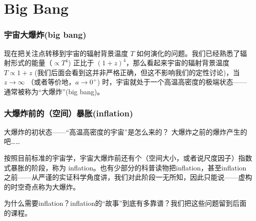 \documentclass[CJK,13pt]{beamer}
\begin{document}




\section{Big Bang}

  \begin{frame}
    \frametitle{宇宙大爆炸(big bang)}
    现在把关注点转移到宇宙的辐射背景温度 $T$ 如何演化的问题。我们已经熟悉了辐射形式的能量（$\propto T^4$) 正比于 $(1+z)^4$，那么看起来宇宙的辐射背景温度 $T\propto 1+z$ (我们后面会看到这并非严格正确，但这不影响我们的定性讨论)，当 $z\rightarrow \infty$ （或者等价地，$a\rightarrow 0^+$) 时，宇宙就处于一个高温高密度的极端状态——通常被称为“大爆炸”(big bang)。

        \skipline
        
  \end{frame}


  \begin{frame}
    \frametitle{大爆炸前的（空间）暴胀(inflation)}
    \question 大爆炸的初状态——“高温高密度的宇宙”是怎么来的？
    \answer 大爆炸之前的爆炸产生的吧……

    \skiplines

    按照目前标准的宇宙学，宇宙大爆炸前还有个（空间大小，或者说尺度因子）指数式暴胀的阶段，称为 inflation。也有少部分的科普读物把inflation，甚至inflation之前——从严谨的实证科学角度讲，我们对此阶段一无所知，因此只能说——虚构的时空奇点称为大爆炸。

    \skiplines

    为什么需要inflation？inflation的“故事”到底有多靠谱？我们把这些问题留到后面的课程。
  \end{frame}
  
    \ech
\end{document}
